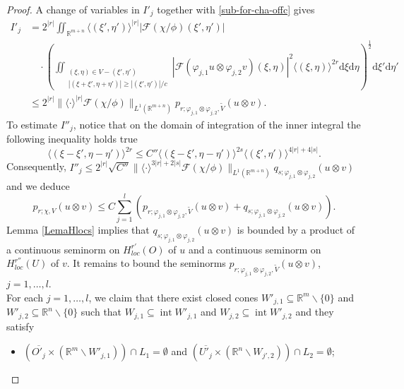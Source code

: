 \documentclass{amsart}
\theoremstyle{definition}
\begin{document}
\begin{proof}
A change of variables in $I'_j$ together with \eqref{sub-for-cha-offc} gives
\begin{align*}
I'_j&=2^{|r|}\iint_{\mathbb{R}^{m+n}} \langle(\xi',\eta')\rangle^{|r|}|\mathcal{F}(\chi/\phi)(\xi',\eta')|\\
&{}\quad\cdot\left(\iint_{\substack{(\xi,\eta)\in V-(\xi',\eta')\\ |(\xi+\xi',\eta+\eta')|\geq |(\xi',\eta')|/c}}|\mathcal{F}(\varphi_{j,1}u\otimes\varphi_{j,2}v)(\xi,\eta)|^2\langle(\xi,\eta)\rangle^{2r}\mathrm{d}\xi \mathrm{d}\eta\right)^{\frac{1}{2}}\mathrm{d}\xi' \mathrm{d}\eta'\\
&\leq 2^{|r|}\|\langle\cdot\rangle^{|r|}\mathcal{F}(\chi/\phi)\|_{L^1(\mathbb{R}^{m+n})}p_{r;\varphi_{j,1}\otimes\varphi_{j,2},\widetilde{V}}(u\otimes v).
\end{align*}
To estimate $I''_j$, notice that on the domain of integration of the inner integral the following inequality holds true
\begin{equation*}
\langle(\xi-\xi',\eta-\eta')\rangle^{2r}\leq C''\langle(\xi-\xi',\eta-\eta')\rangle^{2s}\langle(\xi',\eta')\rangle^{4|r|+4|s|}.
\end{equation*}
Consequently, $I''_j\leq 2^{|r|}\sqrt{C''}\|\langle\cdot\rangle^{3|r|+2|s|}\mathcal{F}(\chi/\phi)\|_{L^1(\mathbb{R}^{m+n})}q_{s;\varphi_{j,1}\otimes\varphi_{j,2}}(u\otimes v)$ and we deduce
\begin{equation*}
p_{r; \chi , V} (u\otimes v)\leq C \sum_{j=1}^l(p_{r;\varphi_{j,1}\otimes\varphi_{j,2},\widetilde{V}}(u\otimes v)+q_{s;\varphi_{j,1}\otimes\varphi_{j,2}}(u\otimes v)).
\end{equation*}
Lemma \ref{LemaHlocs} implies that $q_{s;\varphi_{j,1}\otimes\varphi_{j,2}}(u\otimes v)$ is bounded by a product of a continuous seminorm on $H_{loc} ^{r'} (O)$ of $u$ and a continuous seminorm on $H_{loc} ^{r''} (U)$ of $v$. It remains to bound the seminorms $p_{r;\varphi_{j,1}\otimes\varphi_{j,2},\widetilde{V}}(u\otimes v)$, $j=1,\ldots,l$.\\
\indent For each $j=1,\ldots,l$, we claim that there exist closed cones $W'_{j,1}\subseteq \mathbb{R}^m\backslash\{0\}$ and $W'_{j,2}\subseteq \mathbb{R}^n\backslash\{0\}$ such that $W_{j,1}\subseteq \operatorname{int}W'_{j,1}$ and $W_{j,2}\subseteq \operatorname{int}W'_{j,2}$ and they satisfy
\begin{itemize}
\item[$(ii)'$] $(\overline{O'_j}\times (\mathbb{R}^m\backslash W'_{j,1}))\cap L_1=\emptyset$ and $(\overline{U'_j}\times(\mathbb{R}^n\backslash W_{j',2}))\cap L_2=\emptyset$;

\end{itemize}
\end{proof}
\end{document}
